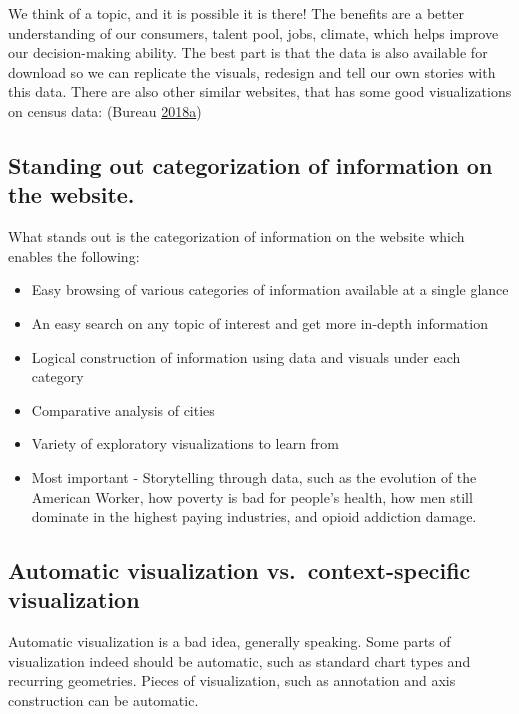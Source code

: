 \documentclass[]{book}
\providecommand{\tightlist}{%
  \setlength{\itemsep}{0pt}\setlength{\parskip}{0pt}}
\begin{document}
We think of a topic, and it is possible it is there! The benefits are a better understanding of our consumers, talent pool, jobs, climate, which helps improve our decision-making ability. The best part is that the data is also available for download so we can replicate the visuals, redesign and tell our own stories with this data.
There are also other similar websites, that has some good visualizations on census data: (Bureau \protect\hyperlink{ref-CensusDataViz}{2018}\protect\hyperlink{ref-CensusDataViz}{a})

\hypertarget{standing-out-categorization-of-information-on-the-website.}{%
\subsection{Standing out categorization of information on the website.}\label{standing-out-categorization-of-information-on-the-website.}}

What stands out is the categorization of information on the website which enables the following:

\begin{itemize}
\tightlist
\item
  Easy browsing of various categories of information available at a single glance
\item
  An easy search on any topic of interest and get more in-depth information
\item
  Logical construction of information using data and visuals under each category
\item
  Comparative analysis of cities
\item
  Variety of exploratory visualizations to learn from
\item
  Most important - Storytelling through data, such as the evolution of the American Worker, how poverty is bad for people's health, how men still dominate in the highest paying industries, and opioid addiction damage.
\end{itemize}

\hypertarget{automatic-visualization-vs.context-specific-visualization}{%
\subsection{Automatic visualization vs.~context-specific visualization}\label{automatic-visualization-vs.context-specific-visualization}}

Automatic visualization is a bad idea, generally speaking. Some parts of visualization indeed should be automatic, such as standard chart types and recurring geometries. Pieces of visualization, such as annotation and axis construction can be automatic.
\end{document}
